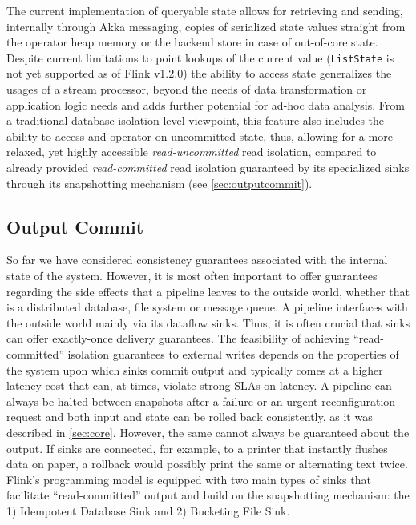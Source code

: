 The current implementation of queryable state allows for retrieving and sending, internally through Akka messaging, copies of serialized state values straight from the operator heap memory or the backend store in case of out-of-core state. Despite current limitations to point lookups of the current value (\texttt{ListState} is not yet supported as of Flink v1.2.0) the ability to access state generalizes the usages of a stream processor, beyond the needs of data transformation or application logic needs and adds further potential for ad-hoc data analysis. From a traditional database isolation-level viewpoint, this feature also includes the ability to access and operator on uncommitted state, thus, allowing for a more relaxed, yet highly accessible \emph{read-uncommitted} read isolation, compared to already provided \emph{read-committed} read isolation guaranteed by its specialized sinks through its snapshotting mechanism (see \autoref{sec:outputcommit}).

\subsection{Output Commit}
\label{sec:outputcommit}

So far we have considered consistency guarantees associated with the internal state of the system. However, it is most often important to offer guarantees regarding the side effects that a pipeline leaves to the outside world, whether that is a distributed database, file system or message queue. A pipeline interfaces with the outside world mainly via its dataflow sinks. Thus, it is often crucial that sinks can offer exactly-once delivery guarantees. The feasibility of achieving ``read-committed'' isolation guarantees to external writes depends on the properties of the system upon which sinks commit output and typically comes at a higher latency cost that can, at-times, violate strong SLAs on latency. A pipeline can always be halted between snapshots after a failure or an urgent reconfiguration request and both input and state can be rolled back consistently, as it was described in \ref{sec:core}. However, the same cannot always be guaranteed about the output. If sinks are connected, for example, to a printer that instantly flushes data on paper, a rollback would possibly print the same or alternating text twice. Flink's programming model is equipped with two main types of sinks that facilitate ``read-committed'' output and build on the snapshotting mechanism: the 1) Idempotent Database Sink and 2) Bucketing File Sink.

